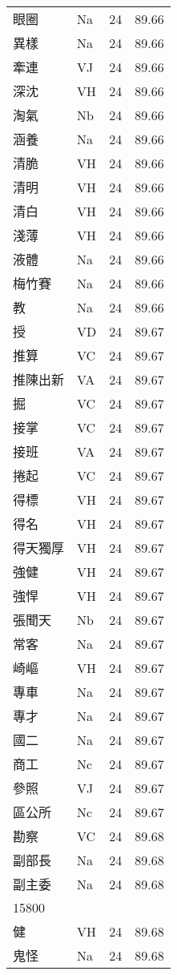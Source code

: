 \documentclass[twocolumn]{book}
\begin{document}
\begin{supertabular}{llrr}
眼圈 & Na & 24 &  89.66\\
異樣 & Na & 24 &  89.66\\
牽連 & VJ & 24 &  89.66\\
深沈 & VH & 24 &  89.66\\
淘氣 & Nb & 24 &  89.66\\
涵養 & Na & 24 &  89.66\\
清脆 & VH & 24 &  89.66\\
清明 & VH & 24 &  89.66\\
清白 & VH & 24 &  89.66\\
淺薄 & VH & 24 &  89.66\\
液體 & Na & 24 &  89.66\\
梅竹賽 & Na & 24 &  89.66\\
教 & Na & 24 &  89.66\\
授 & VD & 24 &  89.67\\
推算 & VC & 24 &  89.67\\
推陳出新 & VA & 24 &  89.67\\
掘 & VC & 24 &  89.67\\
接掌 & VC & 24 &  89.67\\
接班 & VA & 24 &  89.67\\
捲起 & VC & 24 &  89.67\\
得標 & VH & 24 &  89.67\\
得名 & VH & 24 &  89.67\\
得天獨厚 & VH & 24 &  89.67\\
強健 & VH & 24 &  89.67\\
強悍 & VH & 24 &  89.67\\
張聞天 & Nb & 24 &  89.67\\
常客 & Na & 24 &  89.67\\
崎嶇 & VH & 24 &  89.67\\
專車 & Na & 24 &  89.67\\
專才 & Na & 24 &  89.67\\
國二 & Na & 24 &  89.67\\
商工 & Nc & 24 &  89.67\\
參照 & VJ & 24 &  89.67\\
區公所 & Nc & 24 &  89.67\\
勘察 & VC & 24 &  89.68\\
副部長 & Na & 24 &  89.68\\
副主委 & Na & 24 &  89.68\\
15800\\
健 & VH & 24 &  89.68\\
鬼怪 & Na & 24 &  89.68\\

\end{supertabular}
\end{document}
